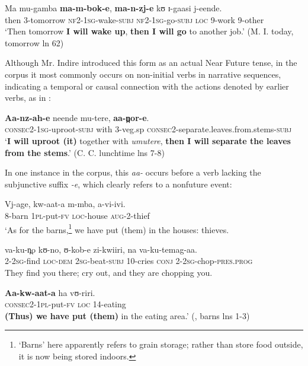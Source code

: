 \documentclass[output=paper]{langsci/langscibook}
\begin{document}
\ea\label{ex:sarvasy:28}
\gll Ma   mu-gamba   \textbf{ma-m-bok-e},     \textbf{ma-n-zj-e}     kʊ   ɪ-gaasi   j-eende. \\
then   3-tomorrow   \textsc{nf2}-\textsc{1sg}-wake-\textsc{subj}  \textsc{nf2}-\textsc{1sg}-go-\textsc{subj}  \textsc{loc}  9-work  9-other \\
\glt ‘Then tomorrow \textbf{I will wake up}, \textbf{then I will go} to another job.’ (M. I. today, tomorrow ln 62)
\z

Although {Mr. Indire} introduced this form as an actual Near Future tense, in the corpus it most commonly occurs on non-initial verbs in narrative sequences, indicating a temporal or causal connection with the actions denoted by earlier verbs, as in : 

\ea\label{ex:sarvasy:29}
\gll \textbf{Aa-nz-ah-e}       neende   mu-tere,  \textbf{aa-n̪or-e}.\\
\textsc{consec2}-\textsc{1sg}-uproot-\textsc{subj}  with  3-veg.sp  \textsc{consec2}-separate.leaves.from.stems-\textsc{subj} \\
\glt ‘\textbf{I will uproot (it)} together with \textit{umutere}, \textbf{then I will separate the leaves from the stems}.’ (C. C. lunchtime lns 7-8)
\z

In one instance in the corpus, this\textit{ aa-} occurs before a verb lacking the subjunctive suffix \textit{-e}, which clearly refers to a nonfuture event:

\ea\label{ex:sarvasy:30}
\gll Vj-age,     kw-aat-a   m-mba,   a-vi-ivi.\\
8-barn    \textsc{1pl}-put-\textsc{fv}  \textsc{loc}-house  \textsc{aug}-2-thief \\
\glt ‘As for the barns,\footnote{‘Barns’ here apparently refers to grain storage; rather than store food outside, it is now being stored indoors.} we have put (them) in the houses: thieves.

\gll va-ku-n̪o   kʊ-no,   ʊ-kob-e     zi-kwiiri,   na   va-ku-temag-aa. \\
2-\textsc{2sg}-find  \textsc{loc}-\textsc{dem}  \textsc{2sg}-beat-\textsc{subj}  10-cries  \textsc{conj}  2-\textsc{2sg}-chop-\textsc{pres}.\textsc{prog} \\
\glt They find you there; cry out, and they are chopping you. 

\gll \textbf{Aa-kw-aat-a}     ha   vʊ-riri. \\
\textsc{consec2}-\textsc{1pl}-put-\textsc{fv}  \textsc{loc}  14-eating \\
\glt \textbf{(Thus) we have put (them)} in the eating area.’ (\citealt{NicholsSsennyonga1976}, barns lns 1-3)
\z
\end{document}
